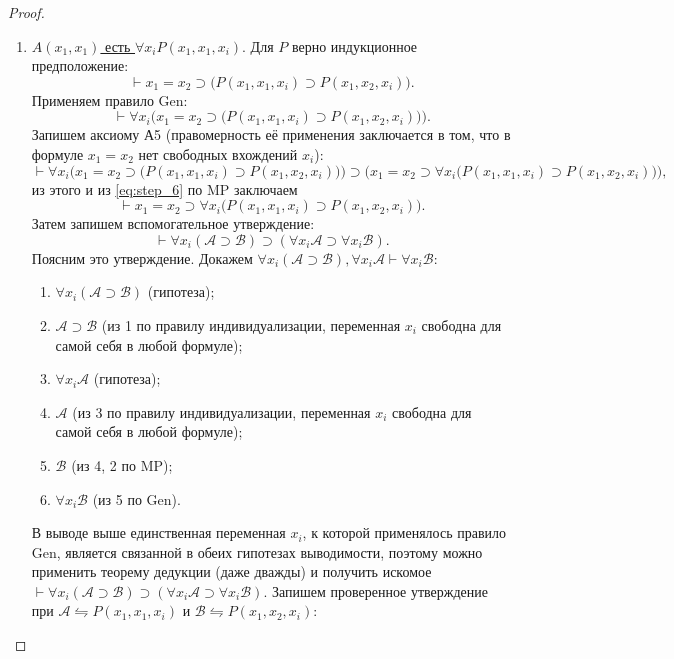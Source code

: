 \begin{proof}
\begin{enumerate}
        \item \underline{$A(x_1, x_1)$ есть $\forall x_iP(x_1, x_1, x_i)$}. Для $P$ верно индукционное предположение:
        \[
            \vdash x_1 = x_2 \supset \big(P(x_1, x_1, x_i) \supset P(x_1, x_2, x_i)\big).
        \]
        Применяем правило Gen:
        \begin{equation}\label{eq:step_6}
            \vdash \forall x_i\Big(x_1 = x_2 \supset \big(P(x_1, x_1, x_i) \supset P(x_1, x_2, x_i)\big)\Big).
        \end{equation}
        Запишем аксиому А5 (правомерность её применения заключается в том, что в формуле $x_1 = x_2$ нет свободных вхождений $x_i$):
        \[
            \vdash \forall x_i\Big(x_1 = x_2 \supset \big(P(x_1, x_1, x_i) \supset P(x_1, x_2, x_i)\big)\Big) \supset \Big(x_1 = x_2 \supset \forall x_i\big(P(x_1, x_1, x_i) \supset P(x_1, x_2, x_i)\big)\Big),
        \]
        из этого и из \eqref{eq:step_6} по MP заключаем
        \begin{equation}\label{eq:step_7}
            \vdash x_1 = x_2 \supset \forall x_i\big(P(x_1, x_1, x_i) \supset P(x_1, x_2, x_i)\big).
        \end{equation}
        Затем запишем вспомогательное утверждение:
        \[
            \vdash \forall x_i(\mathcal{A} \supset \mathcal{B}) \supset (\forall x_i\mathcal{A} \supset \forall x_i\mathcal{B}).
        \]
        Поясним это утверждение. Докажем $\forall x_i(\mathcal{A} \supset \mathcal{B}), \forall x_i\mathcal{A} \vdash \forall x_i\mathcal{B}$:
        \begin{enumerate}[label=\arabic*)]
            \item $\forall x_i(\mathcal{A} \supset \mathcal{B})$ (гипотеза);
            \item $\mathcal{A} \supset \mathcal{B}$ (из 1 по правилу индивидуализации, переменная $x_i$ свободна для самой себя в любой формуле);
            \item $\forall x_i\mathcal{A}$ (гипотеза);
            \item $\mathcal{A}$ (из 3 по правилу индивидуализации, переменная $x_i$ свободна для самой себя в любой формуле);
            \item $\mathcal{B}$ (из 4, 2 по MP);
            \item $\forall x_i\mathcal{B}$ (из 5 по Gen).
        \end{enumerate}
        В выводе выше единственная переменная $x_i$, к которой применялось правило Gen, является связанной в обеих гипотезах выводимости, поэтому можно применить теорему дедукции (даже дважды) и получить искомое $\vdash \forall x_i(\mathcal{A} \supset \mathcal{B}) \supset (\forall x_i\mathcal{A} \supset \forall x_i\mathcal{B})$. Запишем проверенное утверждение при $\mathcal{A} \leftrightharpoons P(x_1, x_1, x_i)$ и $\mathcal{B} \leftrightharpoons P(x_1, x_2, x_i)$:

\end{enumerate}
\end{proof}
